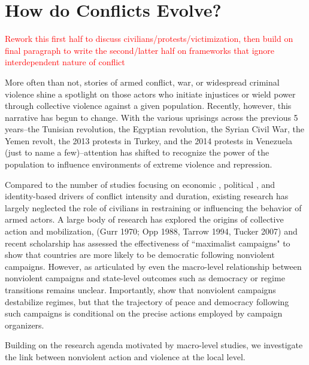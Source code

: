 \section*{How do Conflicts Evolve?} %
\textcolor{red}{Rework this first half to discuss civilians/protests/victimization, then build on final paragraph to write the second/latter half on frameworks that ignore interdependent nature of conflict}

More often than not, stories of armed conflict, war, or widespread criminal violence shine a spotlight on those actors who initiate injustices or wield power through collective violence against a given population. Recently, however, this narrative has begun to change. With the various uprisings across the previous 5 years--the Tunisian revolution, the Egyptian revolution, the Syrian Civil War, the Yemen revolt, the 2013 protests in Turkey, and the 2014 protests in Venezuela (just to name a few)--attention has shifted to recognize the power of the population to influence environments of extreme violence and repression. 

Compared to the number of studies focusing on economic \citep{collier04b}, political \citep{humphreys08}, and identity-based \citep{cederman10b} drivers of conflict intensity and duration, existing research has largely neglected the role of civilians in restraining or influencing the behavior of armed actors. A large body of research has explored the origins of collective action and mobilization, (Gurr 1970; Opp 1988, Tarrow 1994, Tucker 2007) and recent scholarship has assessed the effectiveness of ``maximalist campaigns" \citep{chenoweth2011} to show that countries are more likely to be democratic following nonviolent campaigns. However, as articulated by \cite{celestino2013} even the macro-level relationship between nonviolent campaigns and state-level outcomes such as democracy or regime transitions remains unclear. Importantly, \cite{celestino2013} show that nonviolent campaigns destabilize regimes, but that the trajectory of peace and democracy following such campaigns is conditional on the precise actions employed by campaign organizers. 

Building on the research agenda motivated by macro-level studies, we investigate the link between nonviolent action and violence at the local level. 

